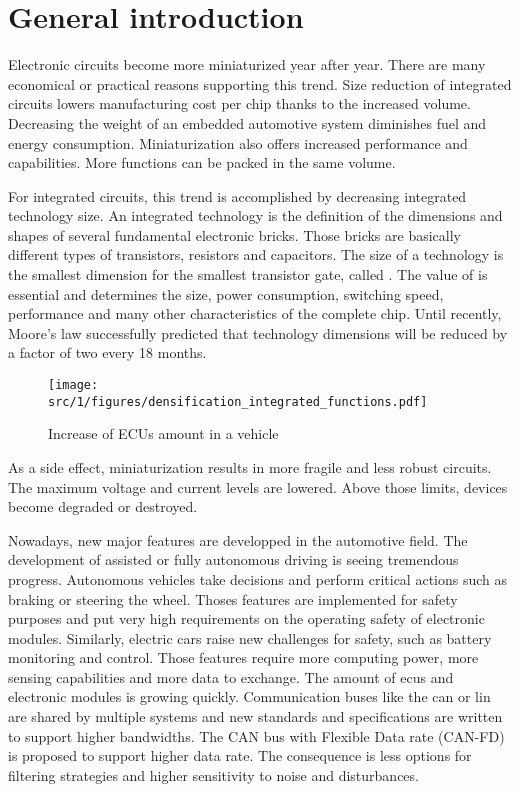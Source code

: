 \section{General introduction}

Electronic circuits become more miniaturized year after year.
There are many economical or practical reasons supporting this trend.
Size reduction of integrated circuits lowers manufacturing cost per chip thanks to the increased volume.
Decreasing the weight of an embedded automotive system diminishes fuel and energy consumption.
Miniaturization also offers increased performance and capabilities.
More functions can be packed in the same volume.

For integrated circuits, this trend is accomplished by decreasing integrated technology size.
An integrated technology is the definition of the dimensions and shapes of several fundamental electronic bricks.
Those bricks are basically different types of transistors, resistors and capacitors.
The size of a technology is the smallest dimension for the smallest transistor gate, called \textlambda.
The value of \textlamda is essential and determines the size, power consumption, switching speed, performance and many other characteristics of the complete chip.
Until recently, Moore's law successfully predicted that technology dimensions will be reduced by a factor of two every 18 months.

\begin{figure}[!h]
  \centering
  \texttt{[image: src/1/figures/densification\_integrated\_functions.pdf]}
  \caption{Increase of ECUs amount in a vehicle}
  \label{fig:ecus-increase}
\end{figure}

As a side effect, miniaturization results in more fragile and less robust circuits.
The maximum voltage and current levels are lowered.
Above those limits, devices become degraded or destroyed.

Nowadays, new major features are developped in the automotive field.
The development of assisted or fully autonomous driving is seeing tremendous progress.
Autonomous vehicles take decisions and perform critical actions such as braking or steering the wheel.
Thoses features are implemented for safety purposes and put very high requirements on the operating safety of electronic modules.
Similarly, electric cars raise new challenges for safety, such as battery monitoring and control.
Those features require more computing power, more sensing capabilities and more data to exchange.
The amount of \gls{ecu}s and electronic modules is growing quickly.
Communication buses like the \gls{can} \cite{CAN} or \gls{lin} \cite{LIN} are shared by multiple systems and new standards and specifications are written to support higher bandwidths.
The CAN bus with Flexible Data rate (CAN-FD) is proposed to support higher data rate.
The consequence is less options for filtering strategies and higher sensitivity to noise and disturbances.

